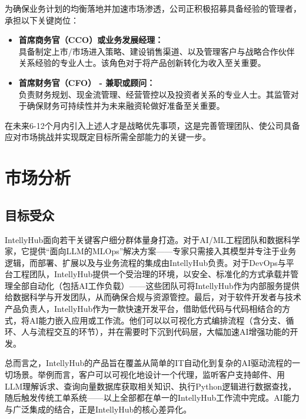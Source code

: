 \documentclass[11pt, a4paper, oneside]{article}
\begin{document}
为确保业务计划的均衡落地并加速市场渗透，公司正积极招募具备经验的管理者，承担以下关键岗位：

\begin{itemize}
    \item \textbf{首席商务官（CCO）或业务发展经理：} \\
    具备制定上市/市场进入策略、建设销售渠道、以及管理客户与战略合作伙伴关系经验的专业人士。该角色对于将产品创新转化为收入至关重要。

    \item \textbf{首席财务官（CFO） - 兼职或顾问：} \\
    负责财务规划、现金流管理、经营管控以及投资者关系的专业人士。其监管对于确保财务可持续性并为未来融资轮做好准备至关重要。
\end{itemize}

在未来6-12个月内引入上述人才是战略优先事项，这是完善管理团队、使公司具备应对市场挑战并实现既定目标所需全部能力的关键一步。


\section{市场分析}
\subsection{目标受众}
IntellyHub面向若干关键客户细分群体量身打造。对于AI/ML工程团队和数据科学家，它提供“面向LLM的MLOps”解决方案——专家只需接入其模型并专注于业务逻辑，而部署、扩展以及与业务流程的集成由IntellyHub负责。对于DevOps与平台工程团队，IntellyHub提供一个受治理的环境，以安全、标准化的方式承载并管理全部自动化（包括AI工作负载）——这些团队可将IntellyHub作为内部服务提供给数据科学与开发团队，从而确保合规与资源管控。最后，对于软件开发者与技术产品负责人，IntellyHub作为一款快速开发平台，借助低代码与代码相结合的方式，将AI能力嵌入应用或工作流。他们可以以可视化方式编排流程（含分支、循环、人与流程交互的环节），并在需要时下沉到代码层，大幅加速AI增强功能的开发。

总而言之，IntellyHub的产品旨在覆盖从简单的IT自动化到复杂的AI驱动流程的一切场景。举例而言，客户可以可视化地设计一个代理，监听客户支持邮件、用LLM理解诉求、查询向量数据库获取相关知识、执行Python逻辑进行数据查找，随后触发传统工单系统——以上全部都在单一的IntellyHub工作流中完成。AI能力与广泛集成的结合，正是IntellyHub的核心差异化。
\end{document}
